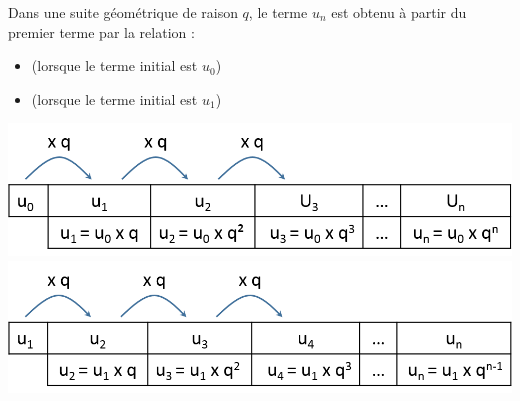 \documentclass[12pt,a4paper]{article}
\begin{document}
\begin{mybilan}
		Dans une suite géométrique de raison $q$, le terme $u_n$ est obtenu à partir du premier terme par la relation :
	\begin{itemize}
		\item {} (lorsque le terme initial est $u_0$) 
		\item {} (lorsque le terme initial est $u_1$)
	\end{itemize}
	
	\begin{multicols}{2}
		\includegraphics[scale=0.4]{./img/geo1}
		\includegraphics[scale=0.4]{./img/geo2}
	\end{multicols}
\end{mybilan}
\end{document}
